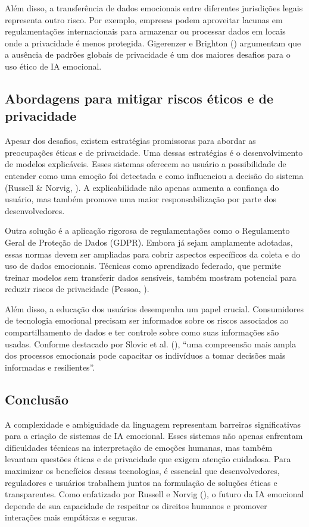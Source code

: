 \documentclass[a4paper,12pt]{report}
\begin{document}
	Além disso, a transferência de dados emocionais entre diferentes jurisdições legais representa outro risco. Por exemplo, empresas podem aproveitar lacunas em regulamentações internacionais para armazenar ou processar dados em locais onde a privacidade é menos protegida. Gigerenzer e Brighton (\citeyear{gigerenzer2009}) argumentam que a ausência de padrões globais de privacidade é um dos maiores desafios para o uso ético de IA emocional.
	
	\subsection{Abordagens para mitigar riscos éticos e de privacidade}
	
	Apesar dos desafios, existem estratégias promissoras para abordar as preocupações éticas e de privacidade. Uma dessas estratégias é o desenvolvimento de modelos explicáveis. Esses sistemas oferecem ao usuário a possibilidade de entender como uma emoção foi detectada e como influenciou a decisão do sistema (Russell \& Norvig, \citeyear{russell2020}). A explicabilidade não apenas aumenta a confiança do usuário, mas também promove uma maior responsabilização por parte dos desenvolvedores.
	
	Outra solução é a aplicação rigorosa de regulamentações como o Regulamento Geral de Proteção de Dados (GDPR). Embora já sejam amplamente adotadas, essas normas devem ser ampliadas para cobrir aspectos específicos da coleta e do uso de dados emocionais. Técnicas como aprendizado federado, que permite treinar modelos sem transferir dados sensíveis, também mostram potencial para reduzir riscos de privacidade (Pessoa, \citeyear{pessoa2008}).
	
	Além disso, a educação dos usuários desempenha um papel crucial. Consumidores de tecnologia emocional precisam ser informados sobre os riscos associados ao compartilhamento de dados e ter controle sobre como suas informações são usadas. Conforme destacado por Slovic et al. (\citeyear{slovic2007}), “uma compreensão mais ampla dos processos emocionais pode capacitar os indivíduos a tomar decisões mais informadas e resilientes”.
	
	\subsection{Conclusão}
	
	A complexidade e ambiguidade da linguagem representam barreiras significativas para a criação de sistemas de IA emocional. Esses sistemas não apenas enfrentam dificuldades técnicas na interpretação de emoções humanas, mas também levantam questões éticas e de privacidade que exigem atenção cuidadosa. Para maximizar os benefícios dessas tecnologias, é essencial que desenvolvedores, reguladores e usuários trabalhem juntos na formulação de soluções éticas e transparentes. Como enfatizado por Russell e Norvig (\citeyear{russell2020}), o futuro da IA emocional depende de sua capacidade de respeitar os direitos humanos e promover interações mais empáticas e seguras.
	
	\newpage
	
	\printbibliography
	
\end{document}
